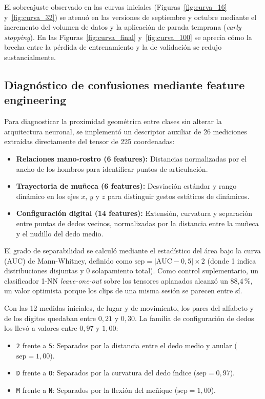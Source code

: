 El sobreajuste observado en las curvas iniciales (Figuras~\ref{fig:curva_16} y~\ref{fig:curva_32}) se atenuó en las versiones de septiembre y octubre mediante el incremento del volumen de datos y la aplicación de parada temprana (\textit{early stopping}). En las Figuras~\ref{fig:curva_final} y~\ref{fig:curva_100} se aprecia cómo la brecha entre la pérdida de entrenamiento y la de validación se redujo sustancialmente.

\subsection{Diagnóstico de confusiones mediante feature engineering}
Para diagnosticar la proximidad geométrica entre clases sin alterar la arquitectura neuronal, se implementó un descriptor auxiliar de 26 mediciones extraídas directamente del tensor de 225 coordenadas:
\begin{itemize}
    \item \textbf{Relaciones mano-rostro (6 features):} Distancias normalizadas por el ancho de los hombros para identificar puntos de articulación.
    \item \textbf{Trayectoria de muñeca (6 features):} Desviación estándar y rango dinámico en los ejes $x$, $y$ y $z$ para distinguir gestos estáticos de dinámicos.
    \item \textbf{Configuración digital (14 features):} Extensión, curvatura y separación entre puntas de dedos vecinos, normalizadas por la distancia entre la muñeca y el nudillo del dedo medio.
\end{itemize}

El grado de separabilidad se calculó mediante el estadístico del área bajo la curva (AUC) de Mann-Whitney, definido como $\mathrm{sep} = \lvert \mathrm{AUC} - 0{,}5 \rvert \times 2$ (donde 1 indica distribuciones disjuntas y 0 solapamiento total). Como control suplementario, un clasificador 1-NN \textit{leave-one-out} sobre los tensores aplanados alcanzó un 88{,}4\,\%, un valor optimista porque los clips de una misma sesión se parecen entre sí.

Con las 12 medidas iniciales, de lugar y de movimiento, los pares del alfabeto y de los dígitos quedaban entre $0{,}21$ y $0{,}30$. La familia de configuración de dedos los llevó a valores entre $0{,}97$ y $1{,}00$:
\begin{itemize}
    \item \texttt{2} frente a \texttt{5}: Separados por la distancia entre el dedo medio y anular ($\mathrm{sep} = 1{,}00$).
    \item \texttt{D} frente a \texttt{O}: Separados por la curvatura del dedo índice ($\mathrm{sep} = 0{,}97$).
    \item \texttt{M} frente a \texttt{N}: Separados por la flexión del meñique ($\mathrm{sep} = 1{,}00$).
\end{itemize}


